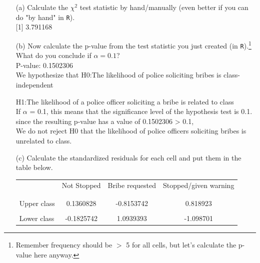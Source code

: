 \documentclass[12pt,letterpaper]{article}
\begin{document}
\begin{enumerate}
	
	\item [(a)]
	Calculate the $\chi^2$ test statistic by hand/manually (even better if you can do "by hand" in \texttt{R}).\\
	
     [1] 3.791168
	
	\item [(b)]
	Now calculate the p-value from the test statistic you just created (in \texttt{R}).\footnote{Remember frequency should be $>$ 5 for all cells, but let's calculate the p-value here anyway.}  What do you conclude if $\alpha = 0.1$?\\
	
	P-value: 0.1502306\\
    We hypothesize that H0:The likelihood of police soliciting bribes is class-independent
    
	                    H1:The likelihood of a police officer soliciting a bribe is related to class\\

	If $\alpha$ = 0.1, this means that the significance level of the hypothesis test is 0.1. since the resulting p-value has a value of 0.1502306 > 0.1,\\
   
    We do not reject H0 that the likelihood of police officers soliciting bribes is unrelated to class.
	\newpage
	\item [(c)] Calculate the standardized residuals for each cell and put them in the table below.
	\vspace{1cm}
	
	\begin{table}[h]
		\centering
		\begin{tabular}{l | c c c }
			& Not Stopped & Bribe requested & Stopped/given warning \\
			\\[-1.8ex] 
			\hline \\[-1.8ex]
			Upper class  & 0.1360828 & -0.8153742 &0.818923  \\
			\\
			Lower class &-0.1825742  &1.0939393   &-1.098701   \\
			
		\end{tabular}
	\end{table}
	

\end{enumerate}
\end{document}

